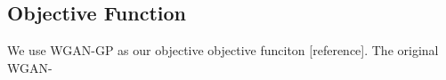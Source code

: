 \subsection{Objective Function}
We use WGAN-GP as our objective objective funciton [reference]. The original WGAN-